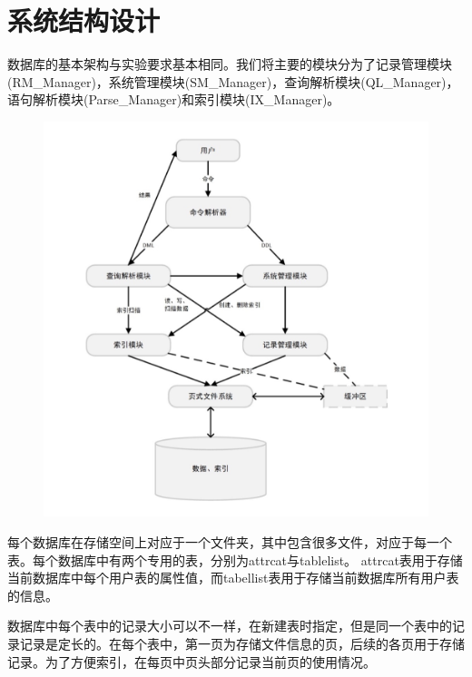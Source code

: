 
\chapter{系统结构设计} %

\label{Chapter2} %



数据库的基本架构与实验要求基本相同。我们将主要的模块分为了记录管理模块(RM\_Manager)，系统管理模块(SM\_Manager)，查询解析模块(QL\_Manager)，语句解析模块(Parse\_Manager)和索引模块(IX\_Manager)。

\begin{figure}[H]
\centering
\includegraphics[width=5in]{Figures/structure.jpg}
\end{figure}

每个数据库在存储空间上对应于一个文件夹，其中包含很多文件，对应于每一个表。每个数据库中有两个专用的表，分别为attrcat与tablelist。 attrcat表用于存储当前数据库中每个用户表的属性值，而tabellist表用于存储当前数据库所有用户表的信息。

数据库中每个表中的记录大小可以不一样，在新建表时指定，但是同一个表中的记录记录是定长的。在每个表中，第一页为存储文件信息的页，后续的各页用于存储记录。为了方便索引，在每页中页头部分记录当前页的使用情况。

